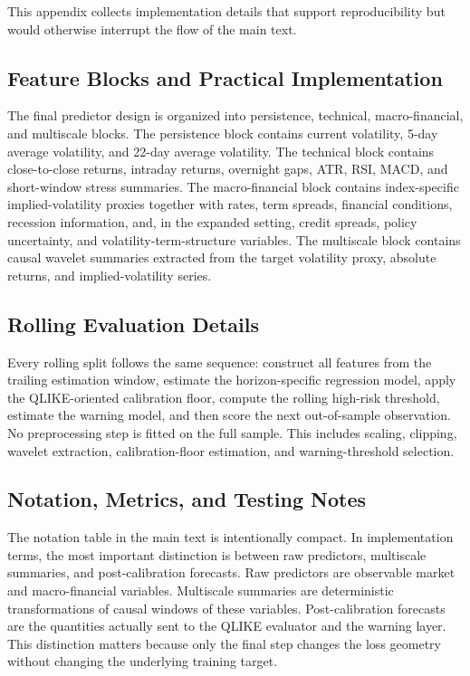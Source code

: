 This appendix collects implementation details that support reproducibility but would otherwise interrupt the flow of the main text.

\subsection{Feature Blocks and Practical Implementation}

The final predictor design is organized into persistence, technical, macro-financial, and multiscale blocks. The persistence block contains current volatility, 5-day average volatility, and 22-day average volatility. The technical block contains close-to-close returns, intraday returns, overnight gaps, ATR, RSI, MACD, and short-window stress summaries. The macro-financial block contains index-specific implied-volatility proxies together with rates, term spreads, financial conditions, recession information, and, in the expanded setting, credit spreads, policy uncertainty, and volatility-term-structure variables. The multiscale block contains causal wavelet summaries extracted from the target volatility proxy, absolute returns, and implied-volatility series.



\subsection{Rolling Evaluation Details}

Every rolling split follows the same sequence: construct all features from the trailing estimation window, estimate the horizon-specific regression model, apply the QLIKE-oriented calibration floor, compute the rolling high-risk threshold, estimate the warning model, and then score the next out-of-sample observation. No preprocessing step is fitted on the full sample. This includes scaling, clipping, wavelet extraction, calibration-floor estimation, and warning-threshold selection.

\subsection{Notation, Metrics, and Testing Notes}

The notation table in the main text is intentionally compact. In implementation terms, the most important distinction is between raw predictors, multiscale summaries, and post-calibration forecasts. Raw predictors are observable market and macro-financial variables. Multiscale summaries are deterministic transformations of causal windows of these variables. Post-calibration forecasts are the quantities actually sent to the QLIKE evaluator and the warning layer. This distinction matters because only the final step changes the loss geometry without changing the underlying training target.


